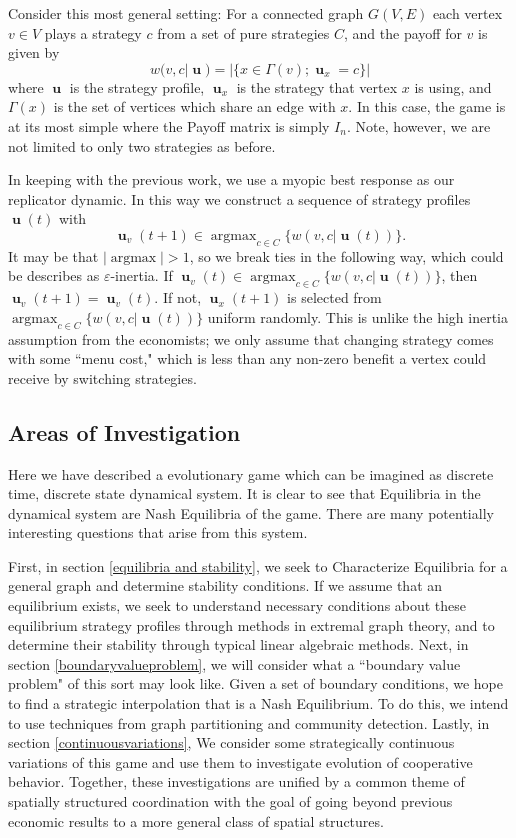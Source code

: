 \documentclass[]{article}
\DeclareMathOperator*{\argmax}{\text{argmax}}
\DeclareMathOperator{\uu}{\mathbf{u}}
\begin{document}
		Consider this most general setting: For a connected graph $G(V,E)$ each vertex $v\in V$ plays a strategy $c$ from a set of pure strategies $C$, and the payoff for $v$ is given by \begin{equation}\label{fitness1}
			w(v,c|\uu)=|\{x\in \Gamma (v);\uu_x=c\}|
		\end{equation}
		where $\uu$ is the strategy profile, $\uu_x$ is the strategy that vertex $x$ is using, and $\Gamma(x)$ is the set of vertices which share an edge with $x$. 
		In this case, the game is at its most simple where the Payoff matrix is simply $I_n$. Note, however, we are not limited to only two strategies as before. 

		In keeping with the previous work, we use a myopic best response as our replicator dynamic. In this way we construct a sequence of strategy profiles $\uu(t)$ with 
		\begin{equation}\label{dsys}
			\uu_v(t+1)\in \argmax_{c\in C}\{w(v,c|\uu(t))\}.
		\end{equation}
		It may be that $|\argmax|>1$, so we break ties in the following way, which could be describes as $\varepsilon$-inertia. If $\uu_v(t)\in \argmax_{c\in C}\{w(v,c|\uu(t))\}$, then $ \uu_v(t+1)=\uu_v(t)$. If not, $\uu_x(t+1)$ is selected from $\argmax_{c\in C}\{w(v,c|\uu(t))\}$ uniform randomly. This is unlike the high inertia assumption from the economists; we only assume that changing strategy comes with some ``menu cost," which is less than any non-zero benefit a vertex could receive by switching strategies.  
		\subsection{Areas of Investigation}\label{areasofinvestigation}
		Here we have described a evolutionary game which can be imagined as discrete time, discrete state dynamical system. It is clear to see that Equilibria in the dynamical system are Nash Equilibria of the game. There are many potentially interesting questions that arise from this system.
		
		First, in section \ref{equilibria and stability},  we seek to Characterize Equilibria for a general graph and determine stability conditions. If we assume that an equilibrium exists, we seek to understand necessary conditions about these equilibrium strategy profiles through methods in extremal graph theory, and to determine their stability through typical linear algebraic methods. 
		Next, in section \ref{boundaryvalueproblem}, we will consider what a ``boundary value problem" of this sort may look like. Given a set of boundary conditions, we hope to find a strategic interpolation that is a Nash Equilibrium. To do this, we intend to use techniques from graph partitioning and community detection. 
		Lastly, in section \ref{continuousvariations}, We consider some strategically continuous variations of this game and use them to investigate evolution of cooperative behavior. Together, these investigations are unified by a common theme of spatially structured coordination with the goal of going beyond previous economic results to a more general class of spatial structures.
		
\end{document}
